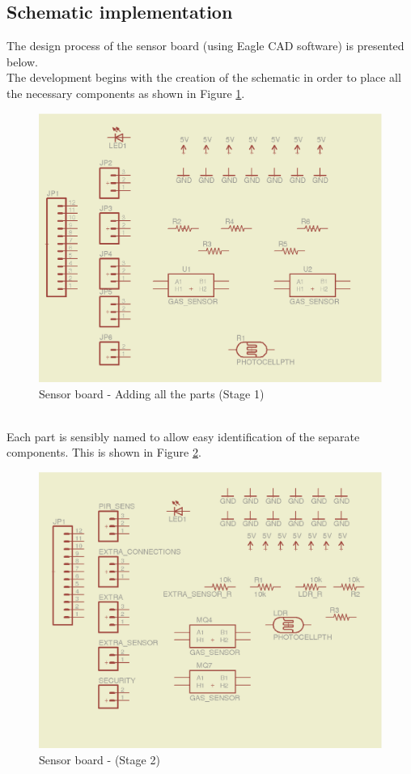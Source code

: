 \documentclass[12pt,a4paper]{report}
\begin{document}
\subsection{Schematic implementation}
The design process of the sensor board (using Eagle CAD software) is presented below.
\ \\
The development begins with the creation of the schematic in order to place all the necessary components as shown in Figure \ref{Sensor-brd-s1}.
\ \\
\begin{figure}[H]
\centering
\includegraphics*[scale=0.25]{sens_brd_s1}
\caption{Sensor board - Adding all the parts (Stage 1)}
\label{Sensor-brd-s1}
\end{figure}
\ \\
Each part is sensibly named to allow easy identification of the separate components.
This is shown in Figure \ref{Sensor-brd-s2}.
\begin{figure}[H]
\centering
\includegraphics*[scale=0.25]{sens_brd_s2}
\caption{Sensor board -  (Stage 2)}
\label{Sensor-brd-s2}
\end{figure}
\end{document}
